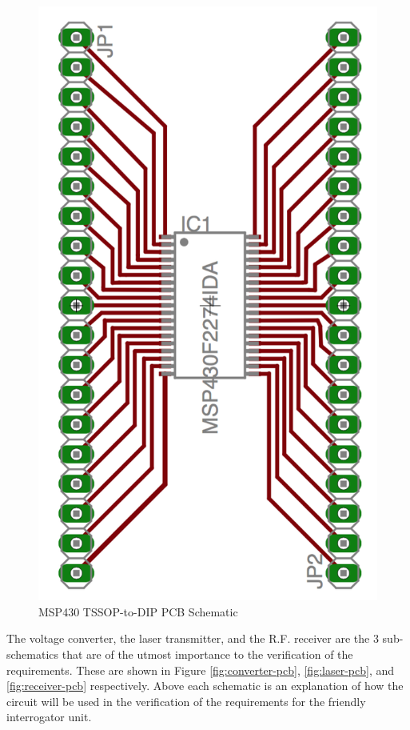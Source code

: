 \documentclass[letterpaper,10pt]{article}
\begin{document}
\begin{spacing}{1.15}
\begin{figure} [H]
	\centering
	\includegraphics[scale=0.4]{msp-breakout.png}
	\caption{MSP430 TSSOP-to-DIP PCB Schematic\label{fig:msp-breakout}}
\end{figure}


 The voltage converter, the laser transmitter, and the R.F. receiver are the 3 sub-schematics that are of the utmost importance to the verification of the requirements. These are shown in Figure \ref{fig:converter-pcb}, \ref{fig:laser-pcb}, and \ref{fig:receiver-pcb} respectively. Above each schematic is an explanation of how the circuit will be used in the verification of the requirements for the friendly interrogator unit. 


\end{spacing}
\end{document}
